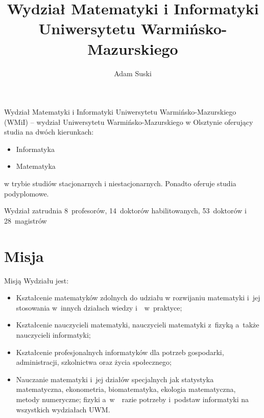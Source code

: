 \documentclass[a4paper,11pt]{article}
\title{Wydział Matematyki i Informatyki Uniwersytetu
Warmińsko-Mazurskiego
}
\author{Adam Suski}
\begin{document}
\maketitle
\begin{abstract}

\end{abstract}

Wydział Matematyki i Informatyki Uniwersytetu Warmińsko-Mazurskiego (WMiI) – wydział
Uniwersytetu Warmińsko-Mazurskiego w Olsztynie oferujący studia na dwóch kierunkach:
\begin{itemize}

\item Informatyka

\item Matematyka
\end{itemize}
w trybie studiów stacjonarnych i niestacjonarnych. Ponadto oferuje studia podyplomowe.

Wydział zatrudnia 8~profesorów, 14~doktorów habilitowanych, 53~doktorów i 28~magistrów

\tableofcontents

\section{Misja} 
Misją Wydziału jest:
\begin{itemize}
\item Kształcenie matematyków zdolnych do udziału w rozwijaniu matematyki i~jej stosowania w~innych
działach wiedzy i~~w~praktyce;

\item Kształcenie nauczycieli matematyki, nauczycieli matematyki z~fizyką a~także nauczycieli informatyki;

\item Kształcenie profesjonalnych informatyków dla potrzeb gospodarki, administracji, szkolnictwa oraz życia
społecznego;

\item Nauczanie matematyki i~jej działów specjalnych jak statystyka matematyczna, ekonometria,
biomatematyka, ekologia matematyczna, metody numeryczne; fizyki a~w~~razie potrzeby i~podstaw
informatyki na wszystkich wydziałach UWM.
\end{itemize}
\end{document}
